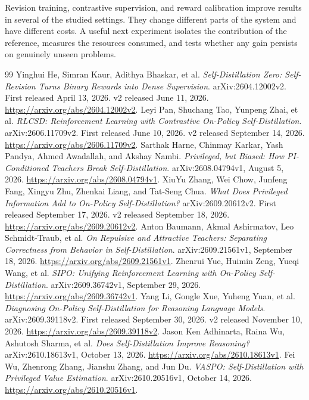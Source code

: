 \documentclass[11pt,a4paper]{article}
\begin{document}
Revision training, contrastive supervision, and reward calibration improve results in several of the studied settings. They change different parts of the system and have different costs. A useful next experiment isolates the contribution of the reference, measures the resources consumed, and tests whether any gain persists on genuinely unseen problems.

\clearpage
{}
{}
\begin{thebibliography}{99}
\small
{} Yinghui He, Simran Kaur, Adithya Bhaskar, et al. \textit{Self-Distillation Zero: Self-Revision Turns Binary Rewards into Dense Supervision}. arXiv:2604.12002v2. First released April 13, 2026. v2 released June 11, 2026. \url{https://arxiv.org/abs/2604.12002v2}.
 Leyi Pan, Shuchang Tao, Yunpeng Zhai, et al. \textit{RLCSD: Reinforcement Learning with Contrastive On-Policy Self-Distillation}. arXiv:2606.11709v2. First released June 10, 2026. v2 released September 14, 2026. \url{https://arxiv.org/abs/2606.11709v2}.
 Sarthak Harne, Chinmay Karkar, Yash Pandya, Ahmed Awadallah, and Akshay Nambi. \textit{Privileged, but Biased: How PI-Conditioned Teachers Break Self-Distillation}. arXiv:2608.04794v1, August 5, 2026. \url{https://arxiv.org/abs/2608.04794v1}.
 XiuYu Zhang, Wei Chow, Junfeng Fang, Xingyu Zhu, Zhenkai Liang, and Tat-Seng Chua. \textit{What Does Privileged Information Add to On-Policy Self-Distillation?} arXiv:2609.20612v2. First released September 17, 2026. v2 released September 18, 2026. \url{https://arxiv.org/abs/2609.20612v2}.
 Anton Baumann, Akmal Ashirmatov, Leo Schmidt-Traub, et al. \textit{On Repulsive and Attractive Teachers: Separating Correctness from Behavior in Self-Distillation}. arXiv:2609.21561v1, September 18, 2026. \url{https://arxiv.org/abs/2609.21561v1}.
 Zhenrui Yue, Huimin Zeng, Yueqi Wang, et al. \textit{SIPO: Unifying Reinforcement Learning with On-Policy Self-Distillation}. arXiv:2609.36742v1, September 29, 2026. \url{https://arxiv.org/abs/2609.36742v1}.
 Yang Li, Gongle Xue, Yuheng Yuan, et al. \textit{Diagnosing On-Policy Self-Distillation for Reasoning Language Models}. arXiv:2609.39118v2. First released September 30, 2026. v2 released November 10, 2026. \url{https://arxiv.org/abs/2609.39118v2}.
 Jason Ken Adhinarta, Raina Wu, Ashutosh Sharma, et al. \textit{Does Self-Distillation Improve Reasoning?} arXiv:2610.18613v1, October 13, 2026. \url{https://arxiv.org/abs/2610.18613v1}.
 Fei Wu, Zhenrong Zhang, Jianshu Zhang, and Jun Du. \textit{VASPO: Self-Distillation with Privileged Value Estimation}. arXiv:2610.20516v1, October 14, 2026. \url{https://arxiv.org/abs/2610.20516v1}.

\end{thebibliography}
\end{document}
